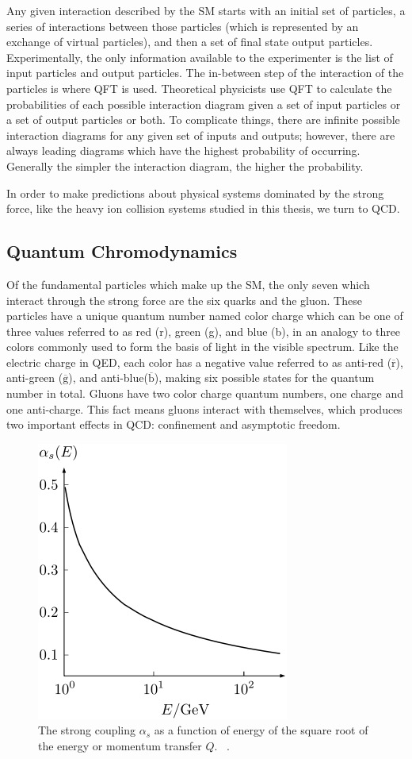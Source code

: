 Any given interaction described by the SM starts with an initial set of particles, a series of interactions between those particles (which is represented by an exchange of virtual particles), and then a set of final state output particles. Experimentally, the only information available to the experimenter is the list of input particles and output particles. The in-between step of the interaction of the particles is where QFT is used. Theoretical physicists use QFT to calculate the probabilities of each possible interaction diagram given a set of input particles or a set of output particles or both. To complicate things, there are infinite possible interaction diagrams for any given set of inputs and outputs; however, there are always leading diagrams which have the highest probability of occurring. Generally the simpler the interaction diagram, the higher the probability.

In order to make predictions about physical systems dominated by the strong force, like the heavy ion collision systems studied in this thesis, we turn to QCD. 

\subsection{Quantum Chromodynamics}
Of the fundamental particles which make up the SM, the only seven which interact through the strong force are the six quarks and the gluon. 
These particles have a unique quantum number named color charge which can be one of three values referred to as
red (r), green (g), and blue (b), in an analogy to three colors commonly used to form the basis of light in the visible spectrum. Like the electric
charge in QED, each color has a negative value
 referred to as anti-red ($\overline{\text{r}}$), anti-green ($\overline{\text{g}}$), and anti-blue($\overline{\text{b}}$), making six possible states for the quantum number in total. Gluons have two color charge quantum numbers, one charge and one anti-charge. This fact means gluons interact with themselves, which produces two important effects in QCD: confinement and asymptotic freedom.

\begin{figure}[!ht]
\begin{center}
\includegraphics[width=0.45\linewidth]{figs/coupling_constant.png}
\caption{The strong coupling $\alpha_s$ as a function of energy of the square root of the energy or momentum transfer $Q$. ~\cite{Bethke2009}.}
\end{center}
\label{fig:coupling_plot}
\end{figure}

